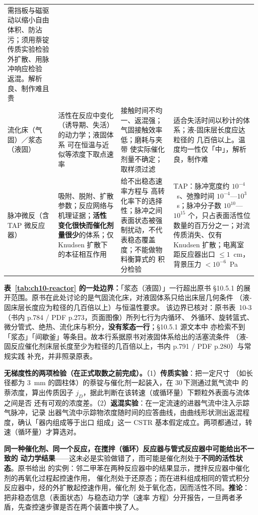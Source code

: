 \begin{table}[tbp]
{\begin{tabularx}{\twocolwidth}{@{}p{17mm}p{40mm}p{40mm}X@{}}
需挡板与磁驱动以缩小自由体积、防沾污；须用萘锭传质实验检验外扩散、用脉冲响应检验
返混。解析良、制作难且贵 \\
流化床（气固）／浆态（液固） & 活性在反应中变化（诱导期、失活）的动力学；液固体系
可在恒温与近似等浓度下取点速率 & 接触时间不均一、返混强；气固接触效率低；磨耗与夹带
使实际催化剂量不确定；取样须过滤 & 适合失活时间以秒计的体系；液-固床层长度应达粒径的
几百倍以上。温度均一性仅「中」，解析良，制作难 \\
脉冲微反（含 TAP 微反应器） & 吸附、脱附、扩散参数；反应网络与机理证据；\textbf{活性
变化很快而催化剂量很少}的体系；仅 Knudsen 扩散下的本征相互作用 & 给不出稳态速率方程与
高转化率下的选择性；脉冲之间表面状态被强制扰动，不代表稳态覆盖度；不能做物料衡算式的
积分检验 & TAP：脉冲宽度约 $10^{-4}$~s、弛豫时间 $10^{-4}$—$10^{3}$~s；脉冲分子数
$10^{10}$—$10^{15}$ 个，只占表面活性位数量的百万分之一；对流传质消失、仅有 Knudsen
扩散；电离室距反应器出口 $\le 1$~cm，背景压力 $<10^{-6}$~Pa \\
\bottomrule
\end{tabularx}}
\end{table}

\noindent\textbf{表~\ref{tab:ch10-reactor} 的一处边界：}「浆态（液固）」一行超出原书
§10.5.1 的展开范围。原书在此处讨论的是气固流化床，对液固体系只给出床层几何条件
（液-固床层长度应为粒径的几百倍以上）与恒温性要求。
该边界已核对：原书表~10-3（书内 p.784 / PDF p.273，页面图像）所列七行为内循环、
外循环、旋转篮式、微分管式、绝热、流化床与积分，\textbf{没有浆态一行}；§10.5.1 源文本中
亦检索不到「浆态」「间歇釜」等条目。故本行系据原书对液固体系给出的活塞流条件
（液-固反应催化剂床层长度至少为粒径的几百倍以上，书内 p.791 / PDF p.280）与常规实践
补充，并非照录原表。

\begin{measure}
\textbf{无梯度性的两项检验（在正式取数之前完成）。}（1）\textbf{传质实验}：把一定尺寸
（如长径都为 $3$~mm 的圆柱体）的萘锭与催化剂一起装入，在 $30$\,\degC 下测通过氮气流中
的萘浓度，算出传质因子 $j_D$，据此判断在该转速（或循环量）下颗粒外表面与流体之间是否
还有可观的浓度差。（2）\textbf{返混实验}：在一定流速的进器气流中注入示踪气脉冲，记录
出器气流中示踪物浓度随时间的应答曲线，由曲线形状测出返混程度，确认「器内组成等于出口
组成」这一 CSTR 基本假定成立。两项都通过，转速（循环量）才算选对。
\end{measure}

\begin{pitfall}
\textbf{同一种催化剂、同一个反应，在搅拌（循环）反应器与管式反应器中可能给出不一致的
动力学结果}——这未必是实验做错了，而可能是催化剂处于\textbf{不同的活性状态}。原书给出
的实例：邻二甲苯在两种反应器中的结果显示，搅拌反应器中催化剂的再氧化过程起控速作用，
催化剂处于还原态；而在进料组成相同的管式积分反应器中，烃的外扩散起控速作用，催化剂
处于氧化态，因而活性不同。\textbf{推论}：把非稳态信息（表面状态）与稳态动力学（速率
方程）分开报告，一旦两者矛盾，先查控速步骤是否在两个装置中换了人。
\end{pitfall}

